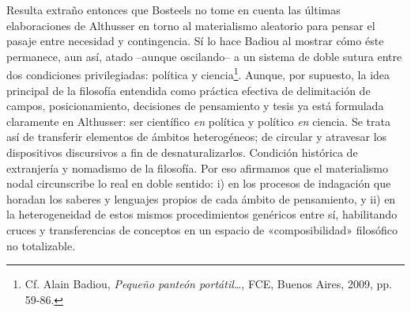 Resulta extraño entonces que Bosteels no tome en cuenta las últimas elaboraciones de Althusser en torno al materialismo aleatorio para pensar el pasaje entre necesidad y contingencia. Sí lo hace Badiou al mostrar cómo éste permanece, aun así, atado --aunque oscilando-- a un sistema de doble sutura entre dos condiciones privilegiadas: política y ciencia\footnote{Cf. Alain Badiou, \emph{Pequeño panteón portátil\ldots{}}, FCE, Buenos Aires, 2009, pp. 59-86.}. Aunque, por supuesto, la idea principal de la filosofía entendida como práctica efectiva de delimitación de campos, posicionamiento, decisiones de pensamiento y tesis ya está formulada claramente en Althusser: ser científico \emph{en} política y político \emph{en} ciencia. Se trata así de transferir elementos de ámbitos heterogéneos; de circular y atravesar los dispositivos discursivos a fin de desnaturalizarlos. Condición histórica de extranjería y nomadismo de la filosofía. Por eso afirmamos que el materialismo nodal circunscribe lo real en doble sentido: i) en los procesos de indagación que horadan los saberes y lenguajes propios de cada ámbito de pensamiento, y ii) en la heterogeneidad de estos mismos procedimientos genéricos entre sí, habilitando cruces y transferencias de conceptos en un espacio de «composibilidad» filosófico no totalizable.

